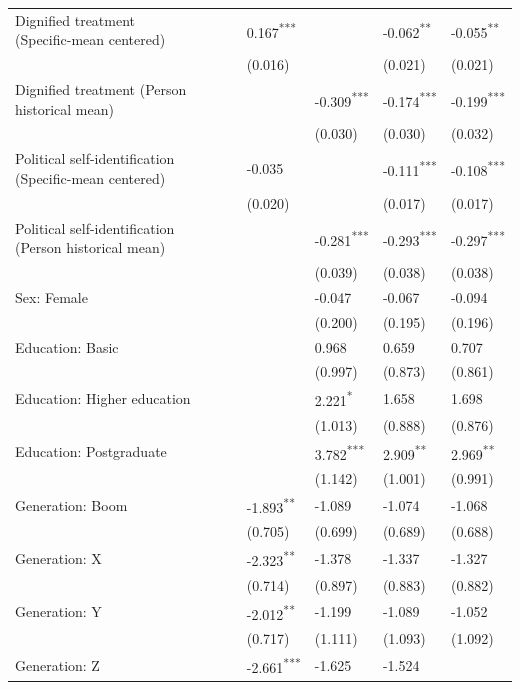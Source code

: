\documentclass[
  spanish,
  a4paper,
  oneside]{scrbook}
\begin{document}
{\begin{longtable}[]{@{}lllllll@{}}
Dignified treatment (Specific-mean centered) & ~ & ~ &
0.167\textsuperscript{***} & ~ & -0.062\textsuperscript{**} &
-0.055\textsuperscript{**} \\
~ & ~ & ~ & (0.016) & ~ & (0.021) & (0.021) \\
Dignified treatment (Person historical mean) & ~ & ~ & ~ &
-0.309\textsuperscript{***} & -0.174\textsuperscript{***} &
-0.199\textsuperscript{***} \\
~ & ~ & ~ & ~ & (0.030) & (0.030) & (0.032) \\
Political self-identification (Specific-mean centered) & ~ & ~ & -0.035
& ~ & -0.111\textsuperscript{***} & -0.108\textsuperscript{***} \\
~ & ~ & ~ & (0.020) & ~ & (0.017) & (0.017) \\
Political self-identification (Person historical mean) & ~ & ~ & ~ &
-0.281\textsuperscript{***} & -0.293\textsuperscript{***} &
-0.297\textsuperscript{***} \\
~ & ~ & ~ & ~ & (0.039) & (0.038) & (0.038) \\
Sex: Female & ~ & ~ & ~ & -0.047 & -0.067 & -0.094 \\
~ & ~ & ~ & ~ & (0.200) & (0.195) & (0.196) \\
Education: Basic & ~ & ~ & ~ & 0.968 & 0.659 & 0.707 \\
~ & ~ & ~ & ~ & (0.997) & (0.873) & (0.861) \\
Education: Higher education & ~ & ~ & ~ & 2.221\textsuperscript{*} &
1.658 & 1.698 \\
~ & ~ & ~ & ~ & (1.013) & (0.888) & (0.876) \\
Education: Postgraduate & ~ & ~ & ~ & 3.782\textsuperscript{***} &
2.909\textsuperscript{**} & 2.969\textsuperscript{**} \\
~ & ~ & ~ & ~ & (1.142) & (1.001) & (0.991) \\
Generation: Boom & ~ & ~ & -1.893\textsuperscript{**} & -1.089 & -1.074
& -1.068 \\
~ & ~ & ~ & (0.705) & (0.699) & (0.689) & (0.688) \\
Generation: X & ~ & ~ & -2.323\textsuperscript{**} & -1.378 & -1.337 &
-1.327 \\
~ & ~ & ~ & (0.714) & (0.897) & (0.883) & (0.882) \\
Generation: Y & ~ & ~ & -2.012\textsuperscript{**} & -1.199 & -1.089 &
-1.052 \\
~ & ~ & ~ & (0.717) & (1.111) & (1.093) & (1.092) \\
Generation: Z & ~ & ~ & -2.661\textsuperscript{***} & -1.625 & -1.524 &

\end{longtable}}
\end{document}
